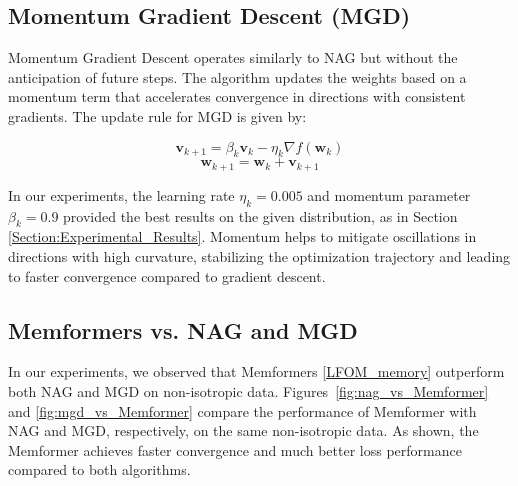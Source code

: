 \documentclass[11pt]{article}
\numberwithin{equation}{section}
\begin{document}
\subsection{Momentum Gradient Descent (MGD)}

Momentum Gradient Descent operates similarly to NAG but without the anticipation of future steps. The algorithm updates the weights based on a momentum term that accelerates convergence in directions with consistent gradients. The update rule for MGD is given by:

\[
\mathbf{v}_{k+1} = \beta_k \mathbf{v}_k - \eta_k \nabla f(\mathbf{w}_k)
\]
\[
\mathbf{w}_{k+1} = \mathbf{w}_k + \mathbf{v}_{k+1}
\]

In our experiments, the learning rate \( \eta_k = 0.005 \) and momentum parameter \( \beta_k = 0.9 \) provided the best results on the given distribution, as in Section 
\ref{Section:Experimental_Results}. Momentum helps to mitigate oscillations in directions with high curvature, stabilizing the optimization trajectory and leading to faster convergence compared to gradient descent.

\subsection{Memformers vs. NAG and MGD}

In our experiments, we observed that Memformers \eqref{LFOM_memory} outperform both NAG and MGD on non-isotropic data. Figures~\ref{fig:nag_vs_Memformer} and \ref{fig:mgd_vs_Memformer} compare the performance of Memformer with NAG and MGD, respectively, on the same non-isotropic data. As shown, the Memformer achieves faster convergence and much better loss performance compared to both algorithms.
\end{document}
